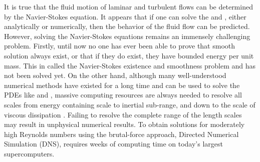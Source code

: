 It is true that the fluid motion of laminar and turbulent flows can be determined by the Navier-Stokes equation. It appears that if one can solve the  and , either analytically or numerically, then the behavior of the fluid flow can be predicted. However, solving the Navier-Stokes equations remains an immensely challenging problem. Firstly, until now no one has ever been able to prove that smooth solution always exist, or that if they do exist, they have bounded energy per unit mass. This in called the Navier-Stokes existence and smoothness problem and has not been solved yet. On the other hand, although many well-understood numerical methods have existed for a long time and can be used to solve the PDEs like  and , massive computing resources are always needed to resolve all scales from energy containing scale to inertial sub-range, and down to the scale of viscous dissipation \cite{PopeTurbulent2000}. Failing to resolve the complete range of the length scales may result in unphysical numerical results. To obtain solutions for moderately high Reynolds numbers using the brutal-force approach, Directed Numerical Simulation (DNS), requires weeks of computing time on today's largest supercomputers. 


